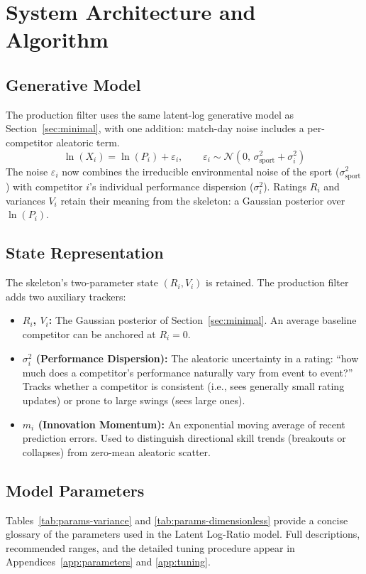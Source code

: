 \documentclass[12pt]{article}
\newcommand{\sigmai}{\sigma_i^2}
\newcommand{\ssport}{\sigma_{\mathrm{sport}}^2}      %
\begin{document}
	\section{System Architecture and Algorithm}

	\subsection{Generative Model}
	The production filter uses the same latent-log generative model as Section~\ref{sec:minimal}, with one addition: match-day noise includes a per-competitor aleatoric term.
	\begin{equation}
		\ln(X_i) = \ln(P_i) + \varepsilon_i, \qquad \varepsilon_i \sim \mathcal{N}(0,\, \ssport + \sigmai)
	\end{equation}
	The noise $\varepsilon_i$ now combines the irreducible environmental noise of the sport ($\ssport$) with competitor $i$'s individual performance dispersion ($\sigmai$). Ratings $R_i$ and variances $V_i$ retain their meaning from the skeleton: a Gaussian posterior over $\ln(P_i)$.

	\subsection{State Representation}
	The skeleton's two-parameter state $(R_i, V_i)$ is retained. The production filter adds two auxiliary trackers:
	\begin{itemize}
		\item \textbf{$R_i$, $V_i$:} The Gaussian posterior of Section~\ref{sec:minimal}. An average baseline competitor can be anchored at $R_i = 0$.
		\item \textbf{$\sigmai$ (Performance Dispersion):} The aleatoric uncertainty in a rating: ``how much does a competitor's performance naturally vary from event to event?'' Tracks whether a competitor is consistent (i.e., sees generally small rating updates) or prone to large swings (sees large ones).
		\item \textbf{$m_i$ (Innovation Momentum):} An exponential moving average of recent prediction errors. Used to distinguish directional skill trends (breakouts or collapses) from zero-mean aleatoric scatter.
	\end{itemize}

	\subsection{Model Parameters}
	Tables~\ref{tab:params-variance} and \ref{tab:params-dimensionless} provide a concise glossary of the parameters used in the Latent Log-Ratio model. Full descriptions, recommended ranges, and the detailed tuning procedure appear in Appendices~\ref{app:parameters} and \ref{app:tuning}.
\end{document}
